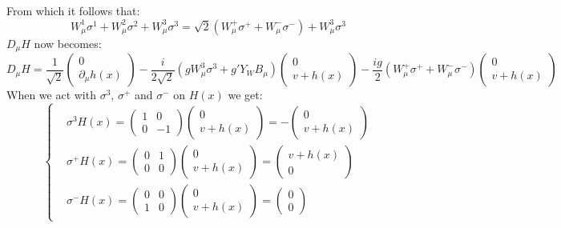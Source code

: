 \documentclass[../main.tex]{subfiles}
\begin{document}
From which it follows that:
\[
W_\mu^1\sigma^1+W_\mu^2\sigma^2+W_\mu^3\sigma^3=\sqrt{2}(W_\mu^+\sigma^++W_\mu^-\sigma^-)+W_\mu^3\sigma^3
\]
$D_\mu H$ now becomes:
\[
D_\mu H=\frac{1}{\sqrt{2}}\begin{pmatrix}0 \\ \partial_\mu h(x)\end{pmatrix}-\frac{i}{2\sqrt{2}}(gW_\mu^3\sigma^3+g'Y_WB_\mu)\begin{pmatrix}0 \\ v+h(x)\end{pmatrix}-\frac{ig}{2}(W_\mu^+\sigma^++W_\mu^-\sigma^-)\begin{pmatrix}0 \\ v+h(x)\end{pmatrix}
\]
When we act with $\sigma^3$, $\sigma^+$ and $\sigma^-$ on $H(x)$ we get:
\[
\left\{
\begin{aligned}
&\sigma^3H(x)=\left(\begin{array}{cc}
    1 & 0 \\
    0 & -1
\end{array}\right)\left(\begin{array}{c}
  0 \\
  v+h(x)
\end{array}\right)=-\left(\begin{array}{c}
  0 \\
  v+h(x)
\end{array}\right) \\
&\sigma^+H(x)=\left(\begin{array}{cc}
    0 & 1 \\
    0 & 0
\end{array}\right)\left(\begin{array}{c}
  0 \\
  v+h(x)
\end{array}\right)=\left(\begin{array}{c}
  v+h(x) \\
  0
\end{array}\right) \\
&\sigma^-H(x)=\left(\begin{array}{cc}
    0 & 0 \\
    1 & 0
\end{array}\right)\left(\begin{array}{c}
  0 \\
  v+h(x)
\end{array}\right)=\left(\begin{array}{c}
  0 \\
  0
\end{array}\right)
\end{aligned}
\right.
\]
\end{document}
